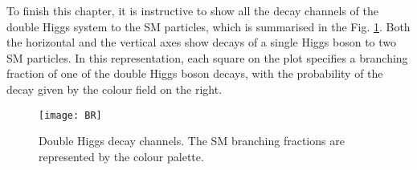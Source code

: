 To finish this chapter, it is instructive to show all the decay channels of the double Higgs system to the SM particles, which is summarised in the Fig. \ref{BR}. Both the horizontal and the vertical axes show decays of a single Higgs boson to two SM particles. In this representation, each square on the plot specifies a branching fraction of one of the double Higgs boson decays, with the probability of the decay given by the colour field on the right. 

\begin{figure}[H]
  \centering
    \texttt{[image: BR]}
    \caption[Double Higgs decay channels]{Double Higgs decay channels. The SM branching fractions are represented by the colour palette.}
    \label{BR}
\end{figure}



